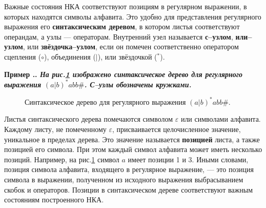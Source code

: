 \documentclass[10pt]{report}
\newcounter{exam}[section]
\renewcommand{\theexam}{\thesection.\arabic{exam}}
\newenvironment{Example}{\par\refstepcounter{exam}\bf Пример \theexam. \sl}{\rm\par}
\newcommand{\nad}[2]{\genfrac{}{}{0pt}{0}{#1}{#2}}
\begin{document}
Важные состояния НКА соответствуют позициям в регулярном выражении, в которых находятся символы алфавита. Это удобно для представления регулярного выражения его
\textbf{синтаксическим деревом}, в котором листья соответствуют операндам, а узлы --- операторам. Внутренний узел называется \textbf{с--узлом}, \textbf{или--узлом}, или
\textbf{звёздочка--узлом}, если он помечен соответственно оператором сцепления ($\circ$), объединения ($|$), или звёздочкой (${}^*$).
\begin{Example}
На рис.\ref{Tree.for.(a|b)ast.abb.sharp} изображено синтаксическое дерево для регулярного выражения $(a|b)^*abb\#$. С--узлы обозначены кружками.
\begin{figure}[!h]
\centering
{
}
\caption{Синтаксическое дерево для регулярного выражения $(a|b)^*abb\#$.}\label{Tree.for.(a|b)ast.abb.sharp}
\end{figure}

Листья синтаксического дерева помечаются символом $\varepsilon$ или символами алфавита. Каждому листу, не помеченному $\varepsilon$, присваивается целочисленное значение,
уникальное в пределах дерева. Это значение называется \textbf{позицией} листа, а также позицией его символа. При этом каждый символ алфавита может иметь несколько позиций.
Например, на рис.\ref{Tree.for.(a|b)ast.abb.sharp} символ $a$ имеет позиции 1 и 3. Иными словами, позиция символа алфавита, входящего в регулярное выражение, --- это позиция
символа в выражении, полученном из исходного выражения выбрасыванием скобок и операторов. Позиции в синтаксическом дереве соответствуют важным состояниям построенного НКА.
\end{Example}
\end{document}
